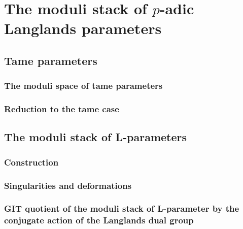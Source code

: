 \section{The moduli stack of \texorpdfstring{$p$}{}-adic Langlands parameters}
    \subsection{Tame parameters}
        \subsubsection{The moduli space of tame parameters}
        
        \subsubsection{Reduction to the tame case}
        
    \subsection{The moduli stack of L-parameters}
        \subsubsection{Construction}
        
        \subsubsection{Singularities and deformations}
    
        \subsubsection{GIT quotient of the moduli stack of L-parameter by the conjugate action of the Langlands dual group}